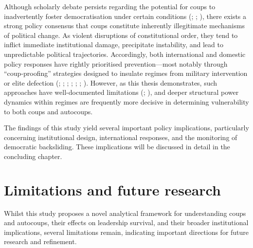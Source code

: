 \documentclass[
  12pt,
]{report}
\begin{document}
Although scholarly debate persists regarding the potential for coups to
inadvertently foster democratisation under certain conditions
(;
;
), there exists a strong policy
consensus that coups constitute inherently illegitimate mechanisms of
political change. As violent disruptions of constitutional order, they
tend to inflict immediate institutional damage, precipitate instability,
and lead to unpredictable political trajectories. Accordingly, both
international and domestic policy responses have rightly prioritised
prevention---most notably through ``coup-proofing'' strategies designed
to insulate regimes from military intervention or elite defection
(;
;
;
;
;
;
). However, as this thesis
demonstrates, such approaches have well-documented limitations
(;
), and deeper structural power
dynamics within regimes are frequently more decisive in determining
vulnerability to both coups and autocoups.

The findings of this study yield several important policy implications,
particularly concerning institutional design, international responses,
and the monitoring of democratic backsliding. These implications will be
discussed in detail in the concluding chapter.

\section{Limitations and future
research}\label{limitations-and-future-research}

Whilst this study proposes a novel analytical framework for
understanding coups and autocoups, their effects on leadership survival,
and their broader institutional implications, several limitations
remain, indicating important directions for future research and
refinement.
\end{document}

